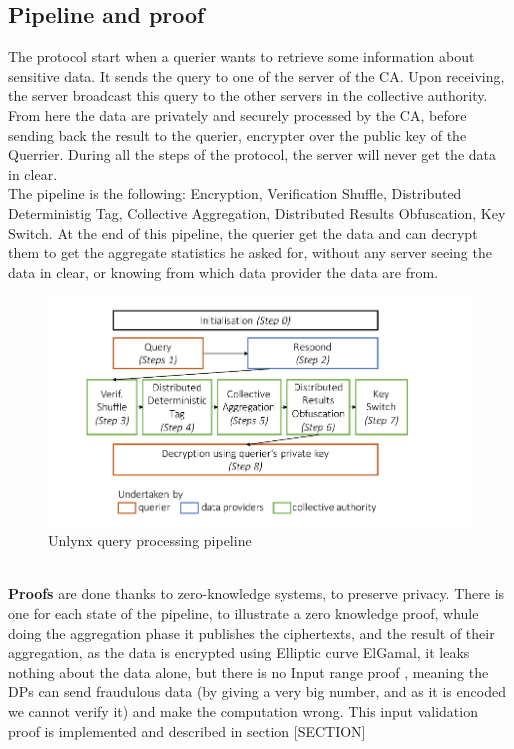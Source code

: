 \documentclass{article}
\begin{document}
\subsection{Pipeline and proof}
The protocol start when a querier wants to retrieve some information about sensitive data. It sends the query to one of the server of the CA. Upon receiving, the server broadcast this query to the other servers in the collective authority.\\
From here the data are privately and securely processed by the CA, before sending back the result to the querier, encrypter over the public key of the Querrier. During all the steps of the protocol, the server will never get the data in clear.\\
The pipeline is the following: Encryption, Verification Shuffle, Distributed Deterministig Tag, Collective Aggregation, Distributed Results Obfuscation, Key Switch. At the end of this pipeline, the querier get the data and can decrypt them to get the aggregate statistics he asked for, without any server seeing the data in clear, or knowing from which data provider the data are from.
\begin{figure}[h]
\centering
\includegraphics[scale=0.5]{img/unlynxPip.png}
\caption{Unlynx query processing pipeline}
\end{figure}
\\
\textbf{Proofs} are done thanks to zero-knowledge systems, to preserve privacy. There is one for each state of the pipeline, to illustrate a zero knowledge proof, whule doing the aggregation phase it publishes the ciphertexts, and the result of their aggregation, as the data is encrypted using Elliptic curve ElGamal, it leaks nothing about the data alone, but there is no Input range proof , meaning the DPs can send fraudulous data (by giving a very big number, and as it is encoded we cannot verify it) and make the computation wrong. This input validation proof is implemented and described in section [SECTION]\\
\end{document}
